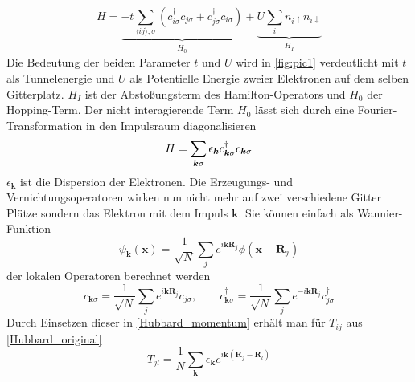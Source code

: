 \begin{equation}\label{Hubbard_standard}
H = \underbrace{-t\sum_{\langle ij\rangle,\sigma}\left( c_{i\sigma}^\dag c_{j\sigma} + c_{j\sigma}^\dag c_{i\sigma}\right)}_{\substack{H_0}}  + \underbrace{U \sum_{i}n_{i\uparrow}n_{i\downarrow}}_{\substack{H_I}}
\end{equation}
Die Bedeutung der beiden Parameter $ t $ und $ U $ wird in \ref{fig:pic1} verdeutlicht mit $ t $ als Tunnelenergie und $ U $ als Potentielle Energie zweier Elektronen auf dem selben Gitterplatz.
$ H_I $ ist der Abstoßungsterm des Hamilton-Operators und $ H_0 $ der Hopping-Term.
Der nicht interagierende Term $ H_0 $ lässt sich durch eine Fourier-Transformation in den Impulsraum diagonalisieren \cite{schoett2014}
\begin{equation}\label{Hubbard_momentum}
H = \sum_{\boldsymbol{k} \sigma} \epsilon_{\boldsymbol{k}} c_{\boldsymbol{k}\sigma}^\dag c_{\boldsymbol{k}\sigma}\\
\end{equation}
$ \epsilon_{\boldsymbol{k}} $ ist die Dispersion der Elektronen. Die Erzeugungs- und Vernichtungsoperatoren wirken nun nicht mehr auf zwei verschiedene Gitter Plätze sondern das Elektron mit dem Impuls $ \boldsymbol{k} $. Sie können einfach als Wannier-Funktion
\begin{equation}\label{Wannier}
\psi_{\boldsymbol{k}} \left( \boldsymbol{x}\right) = \frac{1}{\sqrt{N}}\sum_{j} e^{i\boldsymbol{k}\boldsymbol{R}_j} \phi(\boldsymbol{x}-\boldsymbol{R}_j)
\end{equation} 
der lokalen Operatoren berechnet werden
\begin{equation}\label{c_momentum}
c_{\boldsymbol{k}\sigma} = \frac{1}{\sqrt{N}}\sum_{j} e^{i\boldsymbol{k}\boldsymbol{R}_j} c_{j\sigma}, \qquad c_{\boldsymbol{k}\sigma}^\dagger = \frac{1}{\sqrt{N}}\sum_{j} e^{-i\boldsymbol{k}\boldsymbol{R}_j} c_{j\sigma}^\dagger
\end{equation}\cite{Hubbard}  
Durch Einsetzen dieser in \eqref{Hubbard_momentum} erhält man für $ T_{ij} $ aus \eqref{Hubbard_original}
\begin{equation}\label{T}
T_{jl} = \frac{1}{N} \sum_{\boldsymbol{k}}\epsilon_{\boldsymbol{k}} e^{i\boldsymbol{k}\left( \boldsymbol{R}_j - \boldsymbol{R}_l\right) }
\end{equation}

